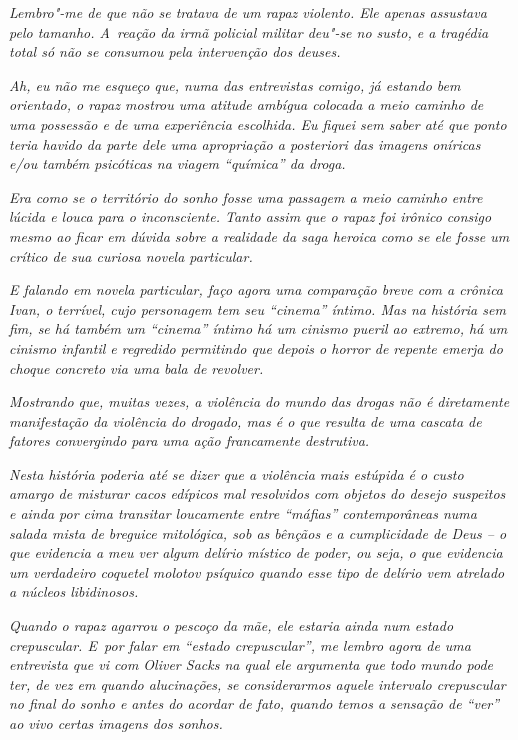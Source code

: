 \emph{Lembro"-me de que não se tratava de um rapaz violento. Ele apenas
assustava pelo tamanho. A~reação da irmã policial militar deu"-se no
susto, e a tragédia total só não se consumou pela intervenção dos
deuses.}~

\emph{Ah, eu não me esqueço que, numa das entrevistas comigo, já estando
bem orientado, o rapaz mostrou uma atitude ambígua colocada a meio
caminho de uma possessão e de uma experiência escolhida. Eu fiquei sem
saber até que ponto teria havido da parte dele uma apropriação a
posteriori das imagens oníricas e/ou também psicóticas na viagem
``química'' da droga.}~

\emph{Era como se o território do sonho fosse uma passagem a meio
caminho entre lúcida e louca para o inconsciente. Tanto assim que o
rapaz foi irônico consigo mesmo ao ficar em dúvida sobre a realidade da
saga heroica como se ele fosse um crítico de sua curiosa novela
particular.}~

\emph{E falando em novela particular, faço agora uma comparação breve
com a crônica Ivan, o terrível, cujo personagem tem seu ``cinema''
íntimo. Mas na história sem fim, se há também um ``cinema'' íntimo há um
cinismo pueril ao extremo, há um cinismo infantil e regredido permitindo
que depois o horror de repente emerja do choque concreto via uma bala de
revolver.}~

\emph{Mostrando que, muitas vezes, a violência do mundo das drogas não é
diretamente manifestação da violência do drogado, mas é o que resulta de
uma cascata de fatores convergindo para uma ação francamente
destrutiva.}~

\emph{Nesta história poderia até se dizer que a violência mais estúpida é
o custo amargo de misturar cacos edípicos mal resolvidos com objetos do
desejo suspeitos e ainda por cima transitar loucamente entre ``máfias''
contemporâneas numa salada mista de breguice mitológica, sob as bênçãos
e a cumplicidade de Deus -- o que evidencia a meu ver algum delírio
místico de poder, ou seja, o que evidencia um verdadeiro coquetel
molotov psíquico quando esse tipo de delírio vem atrelado a núcleos
libidinosos.}~

\emph{Quando o rapaz agarrou o pescoço da mãe, ele estaria ainda num
estado crepuscular. E~por falar em ``estado crepuscular'', me lembro
agora de uma entrevista que vi com Oliver Sacks na qual ele argumenta
que todo mundo pode ter, de vez em quando alucinações, se considerarmos
aquele intervalo crepuscular no final do sonho e antes do acordar de
fato, quando temos a sensação de ``ver'' ao vivo certas imagens dos
sonhos.}~

